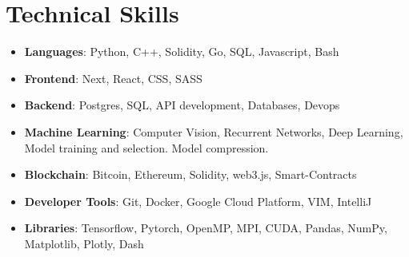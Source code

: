 \documentclass[letterpaper,11pt]{article}
\newcommand{\resumeItem}[1]{
  \item\small{
    {#1 \vspace{-2pt}}
  }
}
\newcommand{\resumeItemListStart}{\begin{itemize}}
\newcommand{\resumeItemListEnd}{\end{itemize}\vspace{-5pt}}
\begin{document}
\section{Technical Skills}
  \resumeItemListStart
    \resumeItem{ \textbf{Languages}: Python, C++, Solidity, Go, SQL, Javascript, Bash}
    \resumeItem{ \textbf{Frontend}: Next, React, CSS, SASS}
    \resumeItem{ \textbf{Backend}: Postgres, SQL, API development, Databases, Devops}
    \resumeItem{ \textbf{Machine Learning}: Computer Vision, Recurrent Networks, Deep Learning, Model training and selection. Model compression.}
    \resumeItem{ \textbf{Blockchain}: Bitcoin, Ethereum, Solidity, web3.js, Smart-Contracts}
    \resumeItem{ \textbf{Developer Tools}: Git, Docker, Google Cloud Platform, VIM, IntelliJ}
    \resumeItem{ \textbf{Libraries}: Tensorflow, Pytorch, OpenMP, MPI, CUDA, Pandas, NumPy, Matplotlib, Plotly, Dash}
  \resumeItemListEnd


\end{document}

